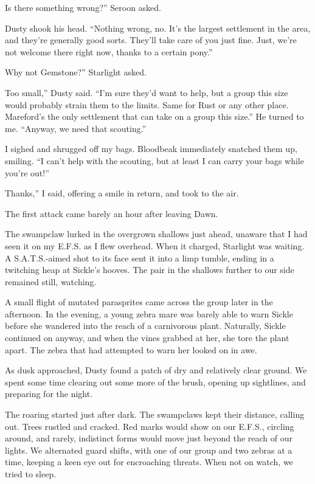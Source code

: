 \leavevmode{}Is there something wrong?” Seroon asked.

Dusty shook his head. “Nothing wrong, no. It’s the largest settlement in the area, and they’re generally good sorts. They’ll take care of you just fine. Just, we’re not welcome there right now, thanks to a certain pony.”

\leavevmode{}Why not Gemstone?” Starlight asked.

\leavevmode{}Too small,” Dusty said. “I’m sure they’d want to help, but a group this size would probably strain them to the limits. Same for Rust or any other place. Mareford’s the only settlement that can take on a group this size.” He turned to me. “Anyway, we need that scouting.”

I sighed and shrugged off my bags. Bloodbeak immediately snatched them up, smiling. “I can’t help with the scouting, but at least I can carry your bags while you’re out!”

\leavevmode{}Thanks,” I said, offering a smile in return, and took to the air.

{\br}%
The first attack came barely an hour after leaving Dawn.

The swampclaw lurked in the overgrown shallows just ahead, unaware that I had seen it on my E.F.S. as I flew overhead. When it charged, Starlight was waiting. A S.A.T.S.-aimed shot to its face sent it into a limp tumble, ending in a twitching heap at Sickle’s hooves. The pair in the shallows further to our side remained still, watching.

A small flight of mutated parasprites came across the group later in the afternoon. In the evening, a young zebra mare was barely able to warn Sickle before she wandered into the reach of a carnivorous plant. Naturally, Sickle continued on anyway, and when the vines grabbed at her, she tore the plant apart. The zebra that had attempted to warn her looked on in awe.

As dusk approached, Dusty found a patch of dry and relatively clear ground. We spent some time clearing out some more of the brush, opening up sightlines, and preparing for the night.

The roaring started just after dark. The swampclaws kept their distance, calling out. Trees rustled and cracked. Red marks would show on our E.F.S., circling around, and rarely, indistinct forms would move just beyond the reach of our lights. We alternated guard shifts, with one of our group and two zebras at a time, keeping a keen eye out for encroaching threats. When not on watch, we tried to sleep.

